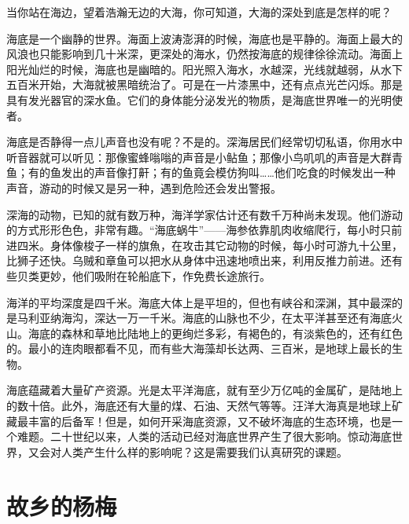 \documentclass[12pt,UTF-8,openany]{ctexbook}
\begin{document}
\begin{Large}
    
    当你站在海边，望着浩瀚无边的大海，你可知道，大海的深处到底是怎样的呢？
    
    海底是一个幽静的世界。海面上波涛澎湃的时候，海底也是平静的。海面上最大的风浪也只能影响到几十米深，更深处的海水，仍然按海底的规律徐徐流动。海面上阳光灿烂的时候，海底也是幽暗的。阳光照入海水，水越深，光线就越弱，从水下五百米开始，大海就被黑暗统治了。可是在一片漆黑中，还有点点光芒闪烁。那是具有发光器官的深水鱼。它们的身体能分泌发光的物质，是海底世界唯一的光明使者。
    
    海底是否静得一点儿声音也没有呢？不是的。深海居民们经常切切私语，你用水中听音器就可以听见：那像蜜蜂嗡嗡的声音是小鲇鱼；那像小鸟叽叽的声音是大群青鱼；有的鱼发出的声音像打鼾；有的鱼竟会模仿狗叫……他们吃食的时候发出一种声音，游动的时候又是另一种，遇到危险还会发出警报。
    
    深海的动物，已知的就有数万种，海洋学家估计还有数千万种尚未发现。他们游动的方式形形色色，非常有趣。“海底蜗牛”——海参依靠肌肉收缩爬行，每小时只前进四米。身体像梭子一样的旗魚，在攻击其它动物的时候，每小时可游九十公里，比狮子还快。乌贼和章鱼可以把水从身体中迅速地喷出来，利用反推力前进。还有些贝类更妙，他们吸附在轮船底下，作免费长途旅行。
    
    海洋的平均深度是四千米。海底大体上是平坦的，但也有峡谷和深渊，其中最深的是马利亚纳海沟，深达一万一千米。海底的山脉也不少，在太平洋甚至还有海底火山。海底的森林和草地比陆地上的更绚烂多彩，有褐色的，有淡紫色的，还有红色的。最小的连肉眼都看不见，而有些大海藻却长达两、三百米，是地球上最长的生物。
    
    海底蕴藏着大量矿产资源。光是太平洋海底，就有至少万亿吨的金属矿，是陆地上的数十倍。此外，海底还有大量的煤、石油、天然气等等。汪洋大海真是地球上矿藏最丰富的后备军！但是，如何开采海底资源，又不破坏海底的生态环境，也是一个难题。二十世纪以来，人类的活动已经对海底世界产生了很大影响。惊动海底世界，又会对人类产生什么样的影响呢？这是需要我们认真研究的课题。
    
\end{Large}

\chapter{故乡的杨梅}
\end{document}
